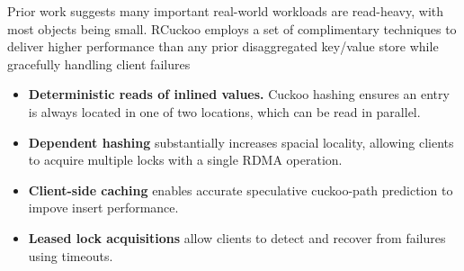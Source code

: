 



Prior work suggests many important real-world workloads are
read-heavy, with most objects being small.  RCuckoo employs a set of
complimentary techniques to deliver higher performance than any prior
disaggregated key/value store while gracefully handling client
failures

\begin{itemize}
\item{\textbf{Deterministic reads of inlined values.}  Cuckoo hashing ensures
  an entry is always located in one of two locations, which can be
  read in parallel.}

\item{\textbf{Dependent hashing} substantially increases spacial locality,
  allowing clients to acquire multiple locks with a single RDMA
  operation.}

\item{\textbf{Client-side caching} enables accurate speculative cuckoo-path
  prediction to impove insert performance.}

\item{\textbf{Leased lock acquisitions} allow clients to detect
  and recover from failures using timeouts.}
\end{itemize}

